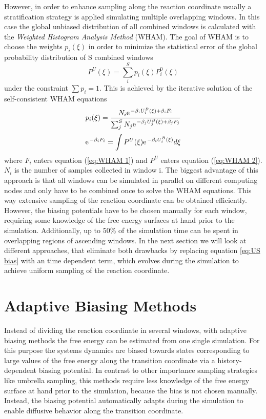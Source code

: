 However, in order to enhance sampling along the reaction coordinate usually a stratification strategy is applied simulating multiple overlapping windows. In this case the global unbiased distribution of all combined windows is calculated with the \textit{Weighted Histogram Analysis Method} (WHAM).\autocite{kumar1992weighted} The goal of WHAM is to choose the weights $p_i(\xi)$ in order to minimize the statistical error of the global probability distribution of S combined windows
\begin{equation}
  P^U(\xi)=\sum_i^{S} p_i(\xi)P_i^0(\xi)
\end{equation}
under the constraint $\sum p_i = 1$. This is achieved by the iterative solution of the self-consistent WHAM equations
\begin{equation}
  p_i(\xi) = \frac{N_i \e^{-\beta_i U_i^B(\xi)+\beta_i F_i}}{\sum_j^S N_j \e^{-\beta_j U_j^B(\xi)+\beta_j F_j}} \label{eq:WHAM 1}
\end{equation}
\begin{equation}
  \e^{-\beta_i F_i} = \int P^U(\xi)\e^{-\beta_i U_i^B (\xi)}d\xi
  \label{eq:WHAM 2}
\end{equation}
where $F_i$ enters equation (\ref{eq:WHAM 1}) and $P^U$ enters equation (\ref{eq:WHAM 2}). $N_i$ is the number of samples collected in window i.
The biggest advantage of this approach is that all windows can be simulated in parallel on different computing nodes and only have to be combined once to solve the WHAM equations. This way extensive sampling of the reaction coordinate can be obtained efficiently.
However, the biasing potentials have to be chosen manually for each window, requiring some knowledge of the free energy surfaces at hand prior to the simulation.
Additionally, up to 50\% of the simulation time can be spent in overlapping regions of ascending windows.\autocite{comer2015adaptive}
In the next section we will look at different approaches, that eliminate both drawbacks by replacing equation \ref{eq:US bias} with an time dependent term, which evolves during the simulation to achieve uniform sampling of the reaction coordinate.

\newpage
\section{Adaptive Biasing Methods}
\label{sec:adaptive biasing}

Instead of dividing the reaction coordinate in several windows, with adaptive biasing methods the free energy can be estimated from one single simulation. For this purpose the systems dynamics are biased towards states corresponding to large values of the free energy along the transition coordinate via a history-dependent biasing potential. In contrast to other importance sampling strategies like umbrella sampling, this methods require less knowledge of the free energy surface at hand prior to the simulation, because the bias is not chosen manually. Instead, the biasing potential automatically adapts during the simulation to enable diffusive behavior along the transition coordinate.\autocite{comer2015adaptive, barducci2011metadynamics}


